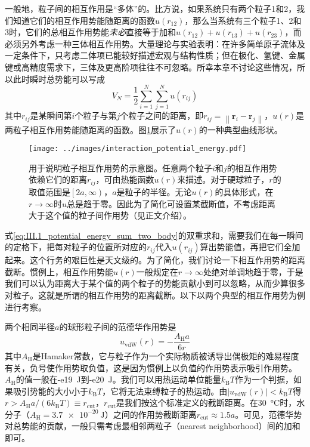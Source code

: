 \documentclass[main.tex]{subfiles}
\begin{document}
一般地，粒子间的相互作用是“多体”的。比方说，如果系统只有两个粒子1和2，我们知道它们的相互作用势能随距离的函数$u\left(r_{12}\right)$，那么当系统有三个粒子1、2和3时，它们的总相互作用势能\emph{未必}直接等于加和$u\left(r_{12}\right)+u\left(r_{13}\right)+u\left(r_{23}\right)$，而必须另外考虑一种三体相互作用势。大量理论与实验表明：在许多简单原子流体及一定条件下，只考虑二体项已能较好描述宏观与结构性质；但在极化、氢键、金属键或高精度需求下，三体及更高阶项往往不可忽略。所幸本章不讨论这些情况，所以此时瞬时总势能可以写成
\begin{equation}\label{eq:III.1_potential_energy_sum_two_body}
  V_N=\frac{1}{2}\sum_{i=1}^N\sum_{j=1}^N u\left(r_{ij}\right)
\end{equation}
其中$r_{ij}$是某瞬间第$i$个粒子与第$j$个粒子之间的距离，即$r_{ij}=\left\|\mathbf{r}_i-\mathbf{r}_j\right\|$，$u\left(r\right)$是两粒子相互作用势能随距离的函数。图\ref{fig:interaction_potential_energy}展示了$u\left(r\right)$的一种典型曲线形状。

\begin{figure}[ht]
  \centering
  \texttt{[image: ../images/interaction\_potential\_energy.pdf]}
  \caption{用于说明粒子相互作用势的示意图。任意两个粒子$i$和$j$的相互作用势依赖它们的距离$r_{ij}$，可由热能函数$u\left(r\right)$来描述。对于硬球粒子，$r$的取值范围是$\left[2a,\infty\right)$，$a$是粒子的半径。无论$u\left(r\right)$的具体形式，在$r\rightarrow \infty$时$u$总是趋于零。因此为了简化可设置某截断值，不考虑距离大于这个值的粒子间作用势（见正文介绍）。}
  \label{fig:interaction_potential_energy}
\end{figure}

式\eqref{eq:III.1_potential_energy_sum_two_body}的双重求和，需要我们在每一瞬间的定格下，把每对粒子的位置所对应的$r_{ij}$代入$u\left(r_{ij}\right)$算出势能值，再把它们全加起来。这个行务的艰巨性是天文级的。为了简化，我们讨论一下相互作用势的距离截断。惯例上，相互作用势能$u\left(r\right)$一般规定在$r\rightarrow\infty$处绝对单调地趋于零，于是我们可以认为距离大于某个值的两个粒子的势能贡献小到可以忽略，从而少算很多对粒子。这就是所谓的相互作用势的距离截断。以下以两个典型的相互作用势为例进行考察。

两个相同半径$a$的球形粒子间的范德华作用势是
\[u_\text{vdW}\left(r\right)=-\frac{A_\text{H}a}{6r}\]
其中$A_\text{H}$是Hamaker常数，它与粒子作为一个实际物质被诱导出偶极矩的难易程度有关，负号使作用势取负值，这是因为惯例上以负值的作用势表示吸引作用势。$A_\text{H}$的值一般在\qty{-e19}{\joule}到\qty{-e20}{\joule}。我们可以用热运动单位能量$k_\text{B}T$作为一个判据，如果吸引势能的大小小于$k_\text{B}T$，它将无法束缚粒子的热运动。由$\left|u_\text{vdW}\left(r\right)\right|<k_\text{B}T$得$r>A_\text{H}a/\left(6k_\text{B}T\right)\equiv r_\text{cut}$，$r_\text{cut}$是我们按这个标准定义的截断距离。在\qty{30}{\degreeCelsius}时，水分子（$A_\text{H}=\qty{3.7e-20}{\joule}$）之间的作用势截断距离$r_\text{cut}\approx 1.5a$。可见，范德华势对总势能的贡献，一般只需考虑最相邻两粒子（nearest neighborhood）间的加和即可。
\end{document}
